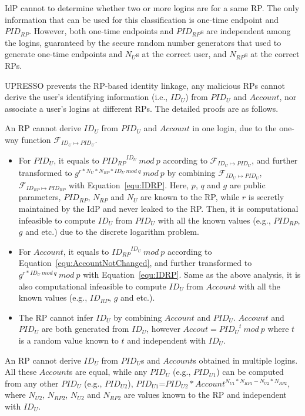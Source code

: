 IdP cannot to determine whether two or more logins are for a same RP. The only information that can be used for this classification is one-time endpoint and $PID_{RP}$. However, both one-time endpoints and $PID_{RP}$s are independent among the logins, guaranteed by the secure random number generators that used to generate one-time endpoints and $N_{U}$s at the correct user, and $N_{RP}$s at the correct RPs.

UPRESSO prevents the RP-based identity linkage, any malicious RPs cannot derive the user's identifying information (i.e., $ID_U$) from $PID_U$ and $Account$, nor associate a user's logins at different RPs.
The detailed proofs are as follows.

An RP cannot derive $ID_U$ from $PID_U$ and $Account$ in one login, due to the one-way function $\mathcal{F}_{ID_{U} \mapsto PID_{U}}$. 
\begin{itemize}
  \item For $PID_U$, it equals to ${PID_{RP}}^{ID_U}\ mod\ p$ according to $\mathcal{F}_{ID_{U} \mapsto PID_{U}}$, and further transformed to $g^{r*N_U*N_{RP}*ID_U\ mod\ q}\ mod\ p$ by combining $\mathcal{F}_{ID_{U} \mapsto PID_{U}}$, $\mathcal{F}_{ID_{RP} \mapsto PID_{RP}}$ with Equation~\ref{equ:IDRP}.
      Here, $p$, $q$ and $g$ are public parameters, $PID_{RP}$, $N_{RP}$ and $N_U$ are known to the RP, while $r$ is secretly maintained by the IdP and never leaked to the RP.
      Then, it is computational infeasible to compute $ID_U$ from $PID_U$ with all the known values (e.g., $PID_{RP}$, $g$ and etc.) due to the discrete logarithm problem.
  \item For $Account$, it equals to ${ID_{RP}}^{ID_U}\ mod\ p$ according to Equation~\ref{equ:AccountNotChanged}, and further transformed to $g^{r*ID_U\ mod\ q}\ mod\ p$ with Equation~\ref{equ:IDRP}. Same as the above analysis, it is also computational infeasible to compute $ID_U$ from $Account$ with all the known values (e.g., $ID_{RP}$, $g$ and etc.).
  \item The RP cannot infer $ID_U$ by combining $Account$ and $PID_U$.
        $Account$ and $PID_U$ are both generated from $ID_U$, however $Accout={PID_U}^t\ mod\ p$ where $t$ is a random value known to $t$ and independent with $ID_U$.
\end{itemize}

An RP cannot derive $ID_U$ from $PID_U$s and $Account$s obtained in multiple logins. All these $Account$s are equal,  while any $PID_{U}$ (e.g., $PID_{U1}$) can be computed from any other $PID_{U}$ (e.g., $PID_{U2}$),  $PID_{U1}$=$PID_{U2} * Account^{N_{U1}*N_{RP1}-N_{U2}*N_{RP2}}$, where $N_{U2}$, $N_{RP2}$, $N_{U2}$ and $N_{RP2}$ are values known to the RP and independent with $ID_U$.

